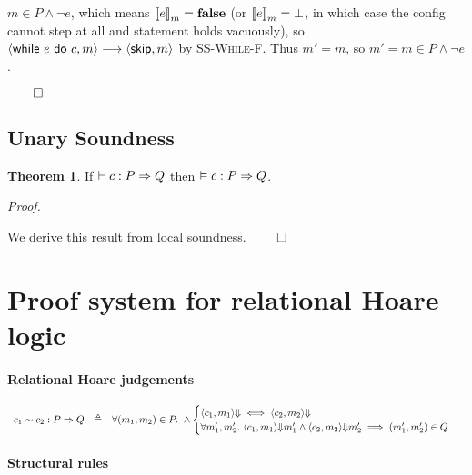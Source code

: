 \documentclass[10pt]{article}
\theoremstyle{definition}
\newtheorem{theorem}{Theorem}
\begin{document}
$m \in P \wedge \neg e$, which means $\Eval(e,m) = \False$
(or $\Eval(e,m) = \bot$, in which case the config cannot step at all and statement holds vacuously),
so $\Cfg(\While e do c,m) \sstepsto \Cfg(\Skip,m)$ by \textsc{SS-While-F}.
Thus $m' = m$, so $m' = m \in P \wedge \neg e$.


\hfill $\qed$

\subsection*{Unary Soundness}
\begin{theorem}
If $\DER \Triple c : P => Q$ then $\VAL \Triple c : P => Q$.
\end{theorem}

\noindent
\emph{Proof.}

\noindent
We derive this result from local soundness.
\hfill $\qed$


\newpage
\section{Proof system for relational Hoare logic}

\paragraph{Relational Hoare judgements}

\begin{displaymath}
\begin{array}{lcl}
    \Quad c_1 ~ c_2 : P => Q
    & \triangleq &
    \forall (m_1,m_2) \in P.\
    \wedge
    \begin{cases}
        \Terminate(c_1,m_1)
        \iff
        \Terminate(c_2,m_2)
        \\
        \forall m'_1, m'_2.\
        \Yields(c_1,m_1,m'_1) \wedge
        \Yields(c_2,m_2,m'_2) \implies
        (m'_1,m'_2) \in Q
    \end{cases}
\end{array}
\end{displaymath}

\paragraph{Structural rules}
\end{document}
